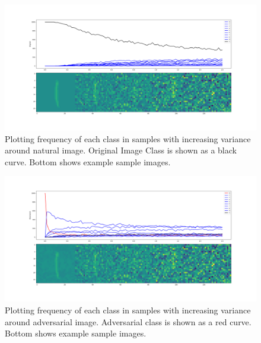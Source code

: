 \documentclass[10pt]{extarticle}
\begin{document}
\begin{figure}[H]
\label{fgsmo}
\includegraphics[trim=200 80 100 100, clip,width=15cm]{2019-04-10-adverse/Image918-O1Anone_varx40.png}
\caption{Plotting frequency of each class in samples with increasing variance around natural image. Original Image Class is shown as a black curve. Bottom shows example sample images. }
\end{figure}
\begin{figure}[H]
\label{fgsma}
\includegraphics[trim=200 80 100 100, clip,width=15cm]{2019-04-10-adverse/Image918-O1A0_varx40.png}
\caption{Plotting frequency of each class in samples with increasing variance around adversarial image. Adversarial class is shown as a red curve. Bottom shows example sample images. }
\end{figure}
\end{document}
